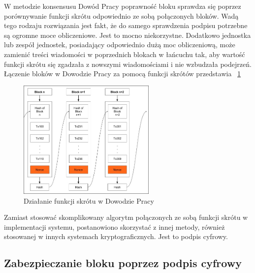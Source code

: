 W metodzie konsensusu Dowód Pracy poprawność bloku sprawdza się poprzez porównywanie funkcji skrótu odpowiednio ze sobą połączonych bloków. Wadą tego rodzaju rozwiązania jest fakt, że do samego sprawdzenia podpisu potrzebne są ogromne moce obliczeniowe. Jest to mocno niekorzystne. Dodatkowo jednostka lub zespół jednostek, posiadający odpowiednio dużą moc obliczeniową, może zamienić treści wiadomości w poprzednich blokach w łańcuchu tak, aby wartość funkcji skrótu się zgadzała z nowszymi wiadomościami i nie wzbudzała podejrzeń.
Łączenie bloków w Dowodzie Pracy za pomocą funkcji skrótów przedstawia \figurename{~\ref{fig:ProofOfWorkHash}}
\begin{figure}[h]
    \centering
    \includegraphics[width=0.6\textwidth]{Images/ProofOfWorkHash.jpg}
    \caption{Działanie funkcji skrótu w Dowodzie Pracy}
    \label{fig:ProofOfWorkHash}
\end{figure}
\newline{}
\newline{}
Zamiast stosować skomplikowany algorytm połączonych ze sobą funkcji skrótu w implementacji systemu, postanowiono skorzystać z innej metody, również stosowanej w innych systemach kryptograficznych. Jest to podpis cyfrowy.

\subsection{Zabezpieczanie bloku poprzez podpis cyfrowy}
\label{ssec:ZabezpieczenieBlokuPodpis}

